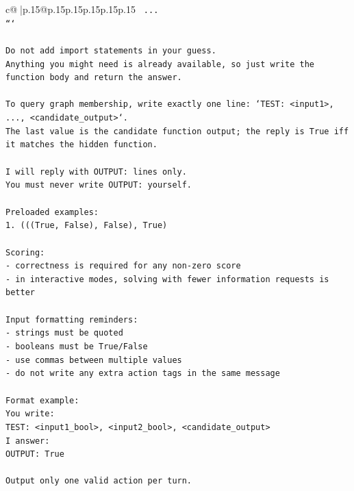 \documentclass{article}
\begin{document}
{\begin{supertabular}{c@{$\;$}|p{.15\linewidth}@{}p{.15\linewidth}p{.15\linewidth}p{.15\linewidth}p{.15\linewidth}p{.15\linewidth}}
{{{\texttt{    ...} \\
\texttt{```} \\
\\ 
\texttt{Do not add import statements in your guess.} \\
\texttt{Anything you might need is already available, so just write the function body and return the answer.} \\
\\ 
\texttt{To query graph membership, write exactly one line: `TEST: <input1>, ..., <candidate\_output>`.} \\
\texttt{The last value is the candidate function output; the reply is True iff it matches the hidden function.} \\
\\ 
\texttt{I will reply with OUTPUT: lines only.} \\
\texttt{You must never write OUTPUT: yourself.} \\
\\ 
\texttt{Preloaded examples:} \\
\texttt{1. (((True, False), False), True)} \\
\\ 
\texttt{Scoring:} \\
\texttt{{-} correctness is required for any non{-}zero score} \\
\texttt{{-} in interactive modes, solving with fewer information requests is better} \\
\\ 
\texttt{Input formatting reminders:} \\
\texttt{{-} strings must be quoted} \\
\texttt{{-} booleans must be True/False} \\
\texttt{{-} use commas between multiple values} \\
\texttt{{-} do not write any extra action tags in the same message} \\
\\ 
\texttt{Format example:} \\
\texttt{You write:} \\
\texttt{TEST: <input1\_bool>, <input2\_bool>, <candidate\_output>} \\
\texttt{I answer:} \\
\texttt{OUTPUT: True} \\
\\ 
\texttt{Output only one valid action per turn.} \\
            }
        }
    }
     \\ \\


\end{supertabular}}
\end{document}
